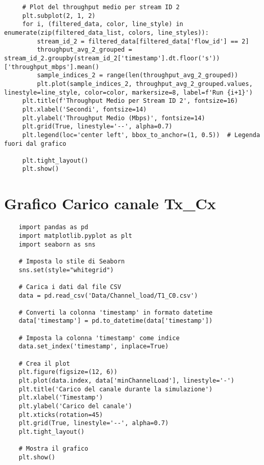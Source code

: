 \begin{lstlisting}
     # Plot del throughput medio per stream ID 2
     plt.subplot(2, 1, 2)
     for i, (filtered_data, color, line_style) in enumerate(zip(filtered_data_list, colors, line_styles)):
         stream_id_2 = filtered_data[filtered_data['flow_id'] == 2]
         throughput_avg_2_grouped = stream_id_2.groupby(stream_id_2['timestamp'].dt.floor('s'))['throughput_mbps'].mean()
         sample_indices_2 = range(len(throughput_avg_2_grouped))
         plt.plot(sample_indices_2, throughput_avg_2_grouped.values, linestyle=line_style, color=color, markersize=8, label=f'Run {i+1}')
     plt.title(f'Throughput Medio per Stream ID 2', fontsize=16)
     plt.xlabel('Secondi', fontsize=14)
     plt.ylabel('Throughput Medio (Mbps)', fontsize=14)
     plt.grid(True, linestyle='--', alpha=0.7)
     plt.legend(loc='center left', bbox_to_anchor=(1, 0.5))  # Legenda fuori dal grafico
     
     plt.tight_layout()
     plt.show()     
\end{lstlisting}

\section{Grafico Carico canale Tx\_Cx}
\label{plot_test_load}
\begin{lstlisting}
    import pandas as pd
    import matplotlib.pyplot as plt
    import seaborn as sns
    
    # Imposta lo stile di Seaborn
    sns.set(style="whitegrid")
    
    # Carica i dati dal file CSV
    data = pd.read_csv('Data/Channel_load/T1_C0.csv')
    
    # Converti la colonna 'timestamp' in formato datetime
    data['timestamp'] = pd.to_datetime(data['timestamp'])
    
    # Imposta la colonna 'timestamp' come indice
    data.set_index('timestamp', inplace=True)
    
    # Crea il plot
    plt.figure(figsize=(12, 6))
    plt.plot(data.index, data['minChannelLoad'], linestyle='-')
    plt.title('Carico del canale durante la simulazione')
    plt.xlabel('Timestamp')
    plt.ylabel('Carico del canale')
    plt.xticks(rotation=45)
    plt.grid(True, linestyle='--', alpha=0.7)
    plt.tight_layout()
    
    # Mostra il grafico
    plt.show()
\end{lstlisting}

